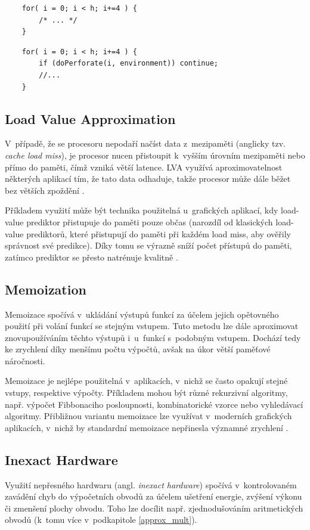 \begin{verbatim}
    for( i = 0; i < h; i+=4 ) { 
        /* ... */ 
    }
\end{verbatim}

\begin{verbatim}
    for( i = 0; i < h; i+=4 ) {
        if (doPerforate(i, environment)) continue;
        //...
    }
\end{verbatim}

\subsection*{Load Value Approximation}
V~případě, že se procesoru nepodaří načíst data z~mezipaměti (anglicky tzv. \textit{cache load miss}), je procesor nucen přistoupit k~vyšším úrovním mezipaměti nebo přímo do paměti, čímž vzniká větší latence. LVA využívá aproximovatelnost některých aplikací tím, že tato data odhaduje, takže procesor může dále běžet bez větších zpoždění \cite{ac_techniques}.

Příkladem využití může být technika použitelná u~grafických aplikací, kdy load-value prediktor přistupuje do paměti pouze občas (narozdíl od klasických load-value prediktorů, které přistupují do paměti při každém load miss, aby ověřily správnost své predikce). Díky tomu se výrazně sníží počet přístupů do paměti, zatímco prediktor se přesto natrénuje kvalitně \cite{load_value_approx}.

\subsection*{Memoization}
Memoizace spočívá v~ukládání výstupů funkcí za účelem jejich opětovného použití při volání funkcí se stejným vstupem. Tuto metodu lze dále aproximovat znovupoužíváním těchto výstupů i~u~funkcí s~podobným vstupem. Dochází tedy ke zrychlení díky menšímu počtu výpočtů, avšak na úkor větší paměťové náročnosti.

Memoizace je nejlépe použitelná v~aplikacích, v~nichž se často opakují stejné vstupy, respektive výpočty. Příkladem mohou být různé rekurzivní algoritmy, např. výpočet Fibbonaciho posloupnosti, kombinatorické vzorce nebo vyhledávací algoritmy. Přibližnou variantu memoizace lze využívat v~moderních grafických aplikacích, v~nichž by standardní memoizace nepřinesla významné zrychlení \cite{ac_techniques}.

\subsection*{Inexact Hardware}
Využití nepřesného hardwaru (angl. \textit{inexact hardware}) spočívá v~kontrolovaném zavádění chyb do výpočetních obvodů za účelem ušetření energie, zvýšení výkonu či zmenšení plochy obvodu. Toho lze docílit např. zjednodušováním aritmetických obvodů (k~tomu více v~podkapitole \ref{approx_mult}).

